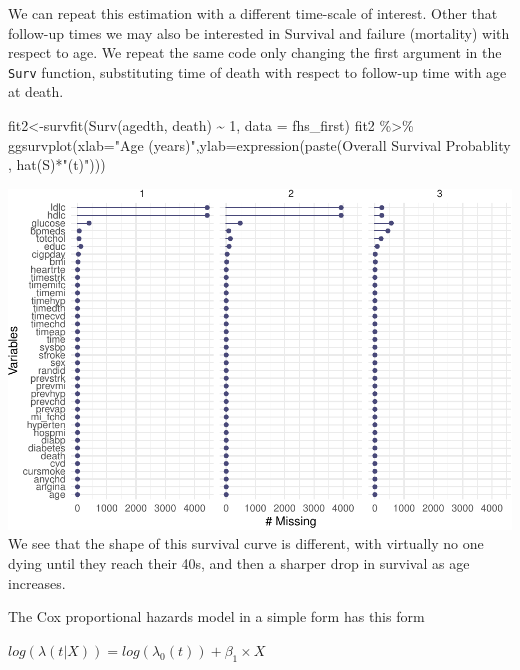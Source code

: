 \documentclass[
]{book}
\newenvironment{Shaded}{\begin{snugshade}}{\end{snugshade}}
\newcommand{\AttributeTok}[1]{\textcolor[rgb]{0.77,0.63,0.00}{#1}}
\newcommand{\DecValTok}[1]{\textcolor[rgb]{0.00,0.00,0.81}{#1}}
\newcommand{\FunctionTok}[1]{\textcolor[rgb]{0.00,0.00,0.00}{#1}}
\newcommand{\NormalTok}[1]{#1}
\newcommand{\OtherTok}[1]{\textcolor[rgb]{0.56,0.35,0.01}{#1}}
\newcommand{\SpecialCharTok}[1]{\textcolor[rgb]{0.00,0.00,0.00}{#1}}
\newcommand{\StringTok}[1]{\textcolor[rgb]{0.31,0.60,0.02}{#1}}
\begin{document}
We can repeat this estimation with a different time-scale of interest. Other that follow-up times we may also be interested in Survival and failure (mortality) with respect to age. We repeat the same code only changing the first argument in the \texttt{Surv} function, substituting time of death with respect to follow-up time with age at death.

\begin{Shaded}
\begin{Highlighting}[]
\NormalTok{fit2}\OtherTok{\textless{}{-}}\FunctionTok{survfit}\NormalTok{(}\FunctionTok{Surv}\NormalTok{(agedth, death) }\SpecialCharTok{\textasciitilde{}} \DecValTok{1}\NormalTok{, }\AttributeTok{data =}\NormalTok{ fhs\_first)}
\NormalTok{fit2 }\SpecialCharTok{\%\textgreater{}\%}
\FunctionTok{ggsurvplot}\NormalTok{(}\AttributeTok{xlab=}\StringTok{"Age (years)"}\NormalTok{,}\AttributeTok{ylab=}\FunctionTok{expression}\NormalTok{(}\FunctionTok{paste}\NormalTok{(}\StringTok{\textquotesingle{}Overall Survival Probablity \textquotesingle{}}\NormalTok{, }\FunctionTok{hat}\NormalTok{(S)}\SpecialCharTok{*}\StringTok{"(t)"}\NormalTok{)))}
\end{Highlighting}
\end{Shaded}

\includegraphics{adv_epi_analysis_files/figure-latex/unnamed-chunk-98-1.pdf}
We see that the shape of this survival curve is different, with virtually no one dying until they reach their 40s, and then a sharper drop in survival as age increases.

The Cox proportional hazards model in a simple form has this form

\(log(\lambda(t|X))=log(\lambda_{0}(t))+\beta_{1}\times X\)
\end{document}
